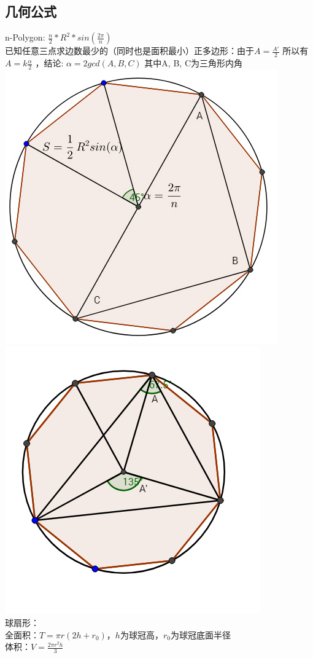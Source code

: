 	\subsection{几何公式}
	n-Polygon: $\frac{n}{2} * R ^ 2 * sin( \frac{2 \pi }{n} )$\\
	已知任意三点求边数最少的（同时也是面积最小）正多边形：由于$A=\frac{A'}{2}$ 所以有$A=k \frac{\alpha}{2}$ ，结论: $\alpha = 2gcd(A,B,C)$ 其中A, B, C为三角形内角\\
	\includegraphics[scale=0.5]{./geometry/npolygon.jpg} \includegraphics[scale=0.6]{./geometry/npolygon_2.png}\\
	球扇形：\\
	全面积：$T = \pi r(2h+r_0)$，$h$为球冠高，$r_0$为球冠底面半径\\
	体积：$V = \frac{2\pi r^{2}h}{3}$\\
	
